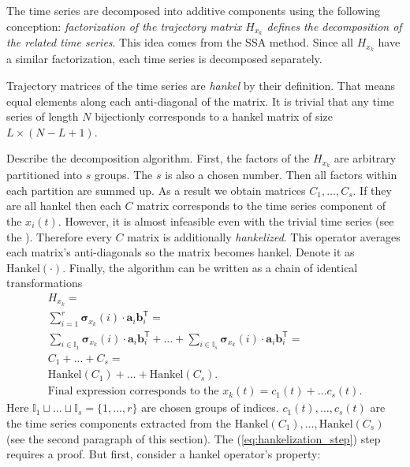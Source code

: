 \documentclass[referee, pdflatex, sn-mathphys-num]{sn-jnl}
\theoremstyle{definition}
\theoremstyle{plain}
\begin{document}
	The time series are decomposed into additive components using the following conception: \emph{factorization of the trajectory matrix $ H_{x_k} $ defines the decomposition of the related time series}. This idea comes from the SSA method. Since all $ H_{x_k} $ have a similar factorization, each time series is decomposed separately.
	
	Trajectory matrices of the time series are \emph{hankel} by their definition. That means equal elements along each anti-diagonal of the matrix. It is trivial that any time series of length $ N $ bijectionly corresponds to a hankel matrix of size $ L \times (N - L + 1) $.
	
	Describe the decomposition algorithm. First, the factors of the $ H_{x_k} $ are arbitrary partitioned into $ s $ groups. The $ s $ is also a chosen number. Then all factors within each partition are summed up. As a result we obtain matrices $ C_1, \ldots, C_s $. If they are all hankel then each $ C $ matrix corresponds to the time series component of the $ x_i(t) $. However, it is almost infeasible even with the trivial time series (see the \cite{ecfb9dc578be43ae9ee8fc88b8ff9151}). Therefore every $ C $ matrix is additionally \emph{hankelized}. This operator averages each matrix's anti-diagonals so the matrix becomes hankel. Denote it as $ \text{Hankel}(\cdot) $. Finally, the algorithm can be written as a chain of identical transformations \begin{gather}
		H_{x_k} = \\
		\sum\limits_{i = 1}^{r} \boldsymbol{\sigma}_{x_k}(i) \cdot \mathbf{a}_i  \mathbf{b}_i^{\mathsf{T}} = \label{eq:decomp_alg_first_step} \\
		\sum\limits_{i \in \mathbb{I}_1} \boldsymbol{\sigma}_{x_k}(i) \cdot \mathbf{a}_i  \mathbf{b}_i^{\mathsf{T}} + \ldots + \sum\limits_{i \in \mathbb{I}_s} \boldsymbol{\sigma}_{x_k}(i) \cdot \mathbf{a}_i  \mathbf{b}_i^{\mathsf{T}} = \\
		C_1 + \ldots + C_s = \label{eq:hankelization_step} \\
	    \text{Hankel}(C_1) + \ldots + \text{Hankel}(C_s). \nonumber \\
	    \text{Final expression corresponds to the } x_k(t) = c_1(t) + \ldots c_s(t). \nonumber
	\end{gather} Here $ \mathbb{I}_1 \sqcup \ldots \sqcup \mathbb{I}_s = \{1, \ldots, r\} $ are chosen groups of indices. $ c_1(t), \ldots , c_s(t) $ are the time series components extracted from the $ \text{Hankel}(C_1), \ldots , \text{Hankel}(C_s) $ (see the second paragraph of this section). The (\ref{eq:hankelization_step}) step requires a proof. But first, consider a hankel operator's property:
	
\end{document}
